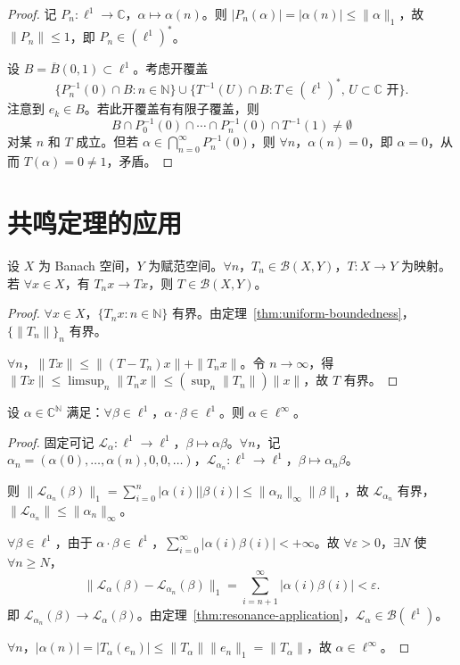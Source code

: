 \documentclass[lang=cn,a4paper,newtx,section]{elegantbook}
\begin{document}
\begin{proof}
  记 $P_n:\ell^1\to\mathbb{C}$，$\alpha\mapsto\alpha(n)$。则 $|P_n(\alpha)|=|\alpha(n)|\leq\|\alpha\|_1$，故 $\|P_n\|\leq 1$，即 $P_n\in(\ell^1)^*$。

  设 $B=\overline{B}(0,1)\subset\ell^1$。考虑开覆盖
  \[
    \{P_n^{-1}(0)\cap B:n\in\mathbb{N}\}\cup\{T^{-1}(U)\cap B:T\in(\ell^1)^*,\,U\subset\mathbb{C}\text{ 开}\}.
  \]
  注意到 $e_k\in B$。若此开覆盖有有限子覆盖，则
  \[
    B\cap P_0^{-1}(0)\cap\cdots\cap P_n^{-1}(0)\cap T^{-1}(1)\neq\emptyset
  \]
  对某 $n$ 和 $T$ 成立。但若 $\alpha\in\bigcap_{n=0}^{\infty}P_n^{-1}(0)$，则 $\forall n$，$\alpha(n)=0$，即 $\alpha=0$，从而 $T(\alpha)=0\neq 1$，矛盾。
\end{proof}

\section{共鸣定理的应用}

\begin{theorem}[共鸣定理的应用]\label{thm:resonance-application}
  设 $X$ 为 Banach 空间，$Y$ 为赋范空间。$\forall n$，$T_n\in\mathcal{B}(X,Y)$，$T:X\to Y$ 为映射。若 $\forall x\in X$，有 $T_nx\to Tx$，则 $T\in\mathcal{B}(X,Y)$。
\end{theorem}

\begin{proof}
  $\forall x\in X$，$\{T_nx:n\in\mathbb{N}\}$ 有界。由定理~\ref{thm:uniform-boundedness}，$\{\|T_n\|\}_n$ 有界。

  $\forall n$，$\|Tx\|\leq\|(T-T_n)x\|+\|T_nx\|$。令 $n\to\infty$，得 $\|Tx\|\leq\limsup_n\|T_nx\|\leq(\sup_n\|T_n\|)\|x\|$，故 $T$ 有界。
\end{proof}

\begin{theorem}
  设 $\alpha\in\mathbb{C}^{\mathbb{N}}$ 满足：$\forall\beta\in\ell^1$，$\alpha\cdot\beta\in\ell^1$。则 $\alpha\in\ell^\infty$。
\end{theorem}

\begin{proof}
  固定可记 $\mathscr{L}_\alpha:\ell^1\to\ell^1$，$\beta\mapsto\alpha\beta$。$\forall n$，记 $\alpha_n=(\alpha(0),\ldots,\alpha(n),0,0,\ldots)$，$\mathscr{L}_{\alpha_n}:\ell^1\to\ell^1$，$\beta\mapsto\alpha_n\beta$。

  则 $\|\mathscr{L}_{\alpha_n}(\beta)\|_1=\sum_{i=0}^{n}|\alpha(i)||\beta(i)|\leq\|\alpha_n\|_\infty\|\beta\|_1$，故 $\mathscr{L}_{\alpha_n}$ 有界，$\|\mathscr{L}_{\alpha_n}\|\leq\|\alpha_n\|_\infty$。

  $\forall\beta\in\ell^1$，由于 $\alpha\cdot\beta\in\ell^1$，$\sum_{i=0}^{\infty}|\alpha(i)\beta(i)|<+\infty$。故 $\forall\varepsilon>0$，$\exists N$ 使 $\forall n\geq N$，
  \[
    \|\mathscr{L}_\alpha(\beta)-\mathscr{L}_{\alpha_n}(\beta)\|_1=\sum_{i=n+1}^{\infty}|\alpha(i)\beta(i)|<\varepsilon.
  \]
  即 $\mathscr{L}_{\alpha_n}(\beta)\to\mathscr{L}_\alpha(\beta)$。由定理~\ref{thm:resonance-application}，$\mathscr{L}_\alpha\in\mathcal{B}(\ell^1)$。

  $\forall n$，$|\alpha(n)|=|T_\alpha(e_n)|\leq\|T_\alpha\|\|e_n\|_1=\|T_\alpha\|$，故 $\alpha\in\ell^\infty$。
\end{proof}
\end{document}
